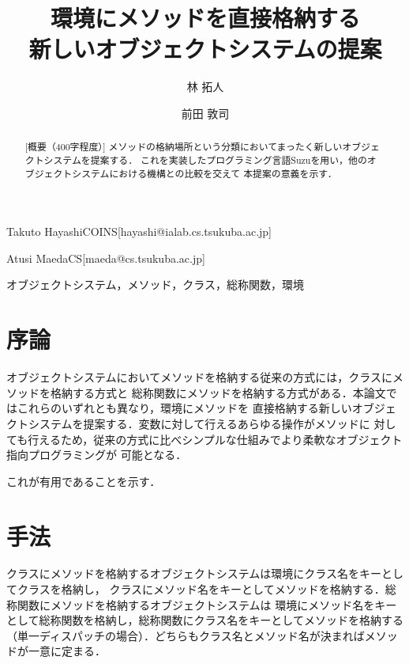 \documentclass{ipsjprosym}
\begin{document}
\title{環境にメソッドを直接格納する \\ 新しいオブジェクトシステムの提案}


\author{林 拓人}{Takuto Hayashi}{COINS}[hayashi@ialab.cs.tsukuba.ac.jp]
\author{前田 敦司}{Atusi Maeda}{CS}[maeda@cs.tsukuba.ac.jp]

\begin{abstract}
[概要（400字程度）]
メソッドの格納場所という分類においてまったく新しいオブジェクトシステムを提案する．
これを実装したプログラミング言語Suzuを用い，他のオブジェクトシステムにおける機構との比較を交えて
本提案の意義を示す．
\end{abstract}

\begin{jkeyword}
オブジェクトシステム，メソッド，クラス，総称関数，環境
\end{jkeyword}

\maketitle

\section{序論}

オブジェクトシステムにおいてメソッドを格納する従来の方式には，クラスにメソッドを格納する方式と
総称関数にメソッドを格納する方式がある．本論文ではこれらのいずれとも異なり，環境にメソッドを
直接格納する新しいオブジェクトシステムを提案する．変数に対して行えるあらゆる操作がメソッドに
対しても行えるため，従来の方式に比べシンプルな仕組みでより柔軟なオブジェクト指向プログラミングが
可能となる．

これが有用であることを示す．

\section{手法}

クラスにメソッドを格納するオブジェクトシステムは環境にクラス名をキーとしてクラスを格納し，
クラスにメソッド名をキーとしてメソッドを格納する．総称関数にメソッドを格納するオブジェクトシステムは
環境にメソッド名をキーとして総称関数を格納し，総称関数にクラス名をキーとしてメソッドを格納する
（単一ディスパッチの場合）\cite{CLOS}．どちらもクラス名とメソッド名が決まればメソッドが一意に定まる．
\end{document}
